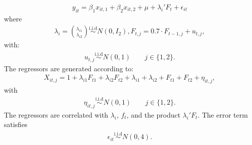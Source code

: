 \documentclass[a4paper,11pt,english]{sphinxmanual}
\begin{document}
\begin{fulllineitems}
\begin{description}
\end{description}
\begin{equation*}
\begin{split}y_{it} = \beta_{1}x_{it,1}+\beta_{2}x_{it,2}+\mu+\lambda_{i}'F_{t}+\epsilon_{it}\end{split}
\end{equation*}
\sphinxAtStartPar
where
\begin{equation*}
\begin{split}\lambda_i = \binom{\lambda_{i1}}{\lambda_{i2}} \stackrel{\text{i.i.d}}{\sim}
N(0,I_2),
F_{t,j}=0.7 \cdot F_{t-1,j}+ u_{t,j},\end{split}
\end{equation*}
\sphinxAtStartPar
with:
\begin{equation*}
\begin{split}u_{t,j}\stackrel{\text{i.i.d}}{\sim} N(0,1) \qquad j\in \{1,2\}.\end{split}
\end{equation*}
\sphinxAtStartPar
The regressors are generated according to:
\begin{equation*}
\begin{split}X_{it,j}= 1+\lambda_{i1}F_{t1}+\lambda_{i2}F_{t2}+\lambda_{i1}+\lambda_{i2}+
F_{t1}+F_{t2}+\eta_{it,j},\end{split}
\end{equation*}
\sphinxAtStartPar
with
\begin{equation*}
\begin{split}\eta_{it,j}\stackrel{\text{i.i.d}}{\sim} N(0,1) \qquad j\in \{1,2\}.\end{split}
\end{equation*}
\sphinxAtStartPar
The regressors are correlated with \(\lambda_i\), \(f_t\), and the product
\(\lambda_i' F_t\).
The error term satisfies
\begin{equation*}
\begin{split}\epsilon_{it} \stackrel{\text{i.i.d}}{\sim}N(0,4).\end{split}
\end{equation*}
\end{fulllineitems}

\end{document}
